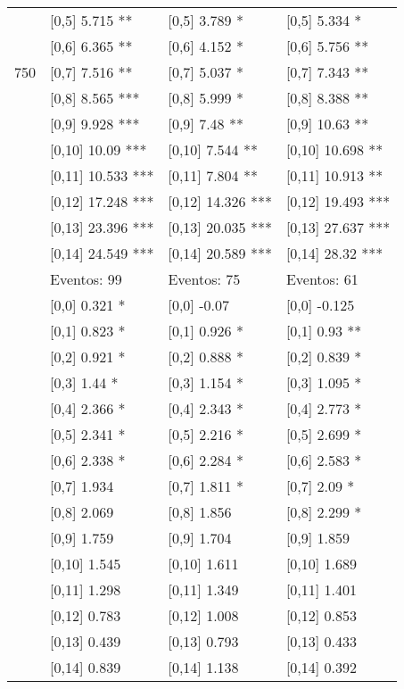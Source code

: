 \begin{table}
\begin{tabular}[t]{llll}
 & {}[0,5] 5.715 ** & {}[0,5] 3.789 * & {}[0,5] 5.334 *\\
 & {}[0,6] 6.365 ** & {}[0,6] 4.152 * & {}[0,6] 5.756 **\\
750 & {}[0,7] 7.516 ** & {}[0,7] 5.037 * & {}[0,7] 7.343 **\\
\addlinespace
 & {}[0,8] 8.565 *** & {}[0,8] 5.999 * & {}[0,8] 8.388 **\\
 & {}[0,9] 9.928 *** & {}[0,9] 7.48 ** & {}[0,9] 10.63 **\\
 & {}[0,10] 10.09 *** & {}[0,10] 7.544 ** & {}[0,10] 10.698 **\\
 & {}[0,11] 10.533 *** & {}[0,11] 7.804 ** & {}[0,11] 10.913 **\\
 & {}[0,12] 17.248 *** & {}[0,12] 14.326 *** & {}[0,12] 19.493 ***\\
\addlinespace
 & {}[0,13] 23.396 *** & {}[0,13] 20.035 *** & {}[0,13] 27.637 ***\\
 & {}[0,14] 24.549 *** & {}[0,14] 20.589 *** & {}[0,14] 28.32 ***\\
 & Eventos:  99 & Eventos:  75 & Eventos:  61\\
 & {}[0,0] 0.321 * & {}[0,0] -0.07 & {}[0,0] -0.125\\
 & {}[0,1] 0.823 * & {}[0,1] 0.926 * & {}[0,1] 0.93 **\\
\addlinespace
 & {}[0,2] 0.921 * & {}[0,2] 0.888 * & {}[0,2] 0.839 *\\
 & {}[0,3] 1.44 * & {}[0,3] 1.154 * & {}[0,3] 1.095 *\\
 & {}[0,4] 2.366 * & {}[0,4] 2.343 * & {}[0,4] 2.773 *\\
 & {}[0,5] 2.341 * & {}[0,5] 2.216 * & {}[0,5] 2.699 *\\
 & {}[0,6] 2.338 * & {}[0,6] 2.284 * & {}[0,6] 2.583 *\\
\addlinespace
1000 & {}[0,7] 1.934 & {}[0,7] 1.811 * & {}[0,7] 2.09 *\\
 & {}[0,8] 2.069 & {}[0,8] 1.856 & {}[0,8] 2.299 *\\
 & {}[0,9] 1.759 & {}[0,9] 1.704 & {}[0,9] 1.859\\
 & {}[0,10] 1.545 & {}[0,10] 1.611 & {}[0,10] 1.689\\
 & {}[0,11] 1.298 & {}[0,11] 1.349 & {}[0,11] 1.401\\
\addlinespace
 & {}[0,12] 0.783 & {}[0,12] 1.008 & {}[0,12] 0.853\\
 & {}[0,13] 0.439 & {}[0,13] 0.793 & {}[0,13] 0.433\\
 & {}[0,14] 0.839 & {}[0,14] 1.138 & {}[0,14] 0.392\\
\bottomrule
\end{tabular}
\end{table}
